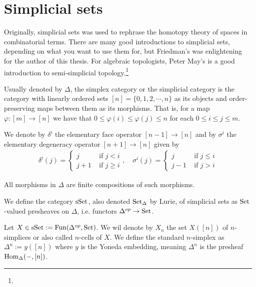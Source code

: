 \documentclass[../../thesis.tex]{subfiles}
\begin{document}
\section{Simplicial sets}
Originally, simplicial sets was used to rephrase the homotopy theory of spaces in combinatorial terms.
There are many good introductions to simplicial sets, depending on what you want to use them for, but Friedman's \cite{friedman2021elementary} was enlightening for the author of this thesis.
For algebraic topologists, Peter May's \cite{MAY} is a good introduction to semi-simplicial topology.\footnote{}
\begin{definition}
    Usually denoted by $\Delta$, the simplex category or the simplicial category is the category with linearly ordered sets $[n]=\{0,1,2,\cdots ,n\}$ as its objects and order-preserving maps between them as its morphisms.
    That is, for a map $\varphi:[m] \to [n]$ we have that $0 \leq \varphi(i)\leq \varphi(j)\leq n$ for each $0 \leq i \leq j \leq m$.
\end{definition}
We denote by $\delta^i$ the elementary face operator $[n-1] \to [n]$ and by $\sigma^i$ the elementary degeneracy operator $[n+1] \to [n]$ given by
\[
    \begin{aligned}
        \delta^i(j) =
        \begin{cases}
            j   & \text{ if } j < i    \\
            j+1 & \text{ if } j \geq i
        \end{cases}, \quad
        \sigma^i(j) =
        \begin{cases}
            j   & \text{ if } j \leq i \\
            j-1 & \text{ if } j > i
        \end{cases}
    \end{aligned}
\]
\begin{remark}
    All morphisms in $\Delta$ are finite compositions of such morphisms.
\end{remark}
\begin{definition}
    We define the category $\mathrm{sSet}$, also denoted $\mathrm{Set}_{\Delta}$ by Lurie, of simplicial sets as $\mathrm{Set}$-valued presheaves on $\Delta$, i.e. functors $\Delta^{op}\to\mathrm{Set}$.
\end{definition}
Let $X \in \mathrm{sSet} : = \mathrm{Fun}(\Delta^{op}, \mathrm{Set})$. We wil denote by $X_n$ the set $X([n])$ of $n$-simplices or also called $n$-cells of $X$.
We define the standard $n$-simplex as $\Delta^n:=y([n])$ where $y$ is the Yoneda embedding, meaning $\Delta^n$ is the presheaf $\mathrm{Hom}_{\Delta}({-},[n])$.
\end{document}
